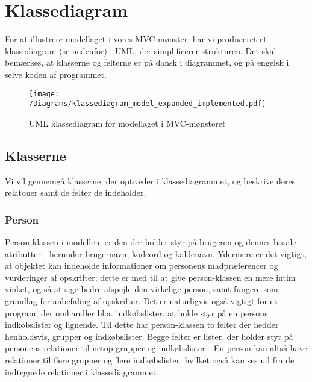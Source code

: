 \section{Klassediagram}
For at illustrere modellaget i vores MVC-mønster, har vi produceret et klassediagram (se  nedenfor) i UML, der simplificerer strukturen.
Det skal bemærkes, at klasserne og felterne er på dansk i diagrammet, og på engelsk i selve koden af programmet. 

\begin{figure}[H]
\centering
\texttt{[image: /Diagrams/klassediagram\_model\_expanded\_implemented.pdf]}
\caption{UML klassediagram for modellaget i MVC-mønsteret}\label{diagram:klassediagram}
\end{figure}

\subsection{Klasserne}
Vi vil gennemgå klasserne, der optræder i klassediagrammet, og beskrive deres relatoner samt de felter de indeholder.

\subsubsection{Person}
Person-klassen i modellen, er den der holder styr på brugeren og dennes basale atributter - herunder brugernavn, kodeord og kaldenavn.
Ydermere er det vigtigt, at objektet kan indeholde informationer om personens madpræferencer og vurderinger af opskrifter; dette er med til at give person-klassen en mere intim vinket, og så at sige bedre afspejle den virkelige person, samt fungere som grundlag for anbefaling af opskrifter.
Det er naturligvis også vigtigt for et program, der omhandler bl.a. indkøbslister, at holde styr på en persons indkøbslister og lignende.
Til dette har person-klassen to felter der hedder henholdsvis, grupper og indkøbslister.
Begge felter er lister, der holder styr på personens relationer til netop grupper og indkøbslister - En person kan altså have relationer til flere grupper og flere indkøbslister, hvilket også kan ses ud fra de indtegnede relationer i klassediagrammet.


